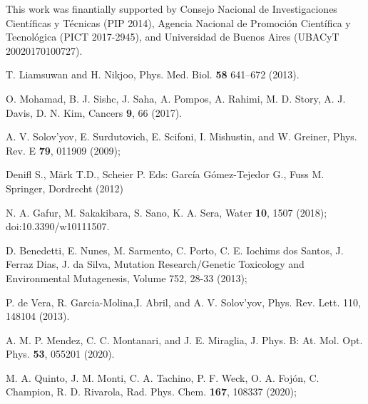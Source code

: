 \documentclass[10pt,showpacs,showkeys,twocolumn]{revtex4-1}
\begin{document}
This work was finantially supported by Consejo Nacional de
Investigaciones Cient\'ificas y T\'ecnicas (PIP 2014), Agencia 
Nacional de Promoci\'on Cient\'ifica y Tecnol\'ogica (PICT 2017-2945), 
and Universidad de Buenos Aires (UBACyT 20020170100727).

\begin{thebibliography}{}

T. Liamsuwan and H. Nikjoo, 
Phys. Med. Biol. \textbf{58}  641--672 (2013).

O. Mohamad, B. J. Sishc, J. Saha, A. Pompos, A. Rahimi, M. D. Story, 
A. J. Davis, D. N. Kim, 
Cancers \textbf{9}, 66 (2017).

A. V. Solov'yov, E. Surdutovich, E. Scifoni, I. Mishustin, and 
W. Greiner, 
Phys. Rev. E \textbf{79}, 011909 (2009);

Denifl S., Märk T.D., Scheier P. 
Eds: Garc\'ia G\'omez-Tejedor G., Fuss M. 
Springer, Dordrecht (2012) 

N. A. Gafur, M.  Sakakibara, S. Sano, K. A. Sera, 
Water \textbf{10}, 1507 (2018); doi:10.3390/w10111507.

D. Benedetti, E. Nunes, M. Sarmento, C. Porto, C. E. Iochims dos Santos, 
J. Ferraz Dias, J. da Silva,
Mutation Research/Genetic Toxicology and Environmental Mutagenesis,
Volume 752, 28-33 (2013);

P. de Vera, R. Garcia-Molina,I. Abril, and A. V. Solov’yov, 
Phys. Rev. Lett.  110, 148104 (2013).

A. M. P. Mendez, C. C. Montanari, and J. E. Miraglia, 
J. Phys. B: At. Mol. Opt. Phys.  \textbf{53}, 055201 (2020).

M. A. Quinto, J. M. Monti, C. A. Tachino, P. F. Weck, O. A. Foj\'on, 
C. Champion, R. D. Rivarola, 
Rad. Phys. Chem. \textbf{167}, 108337 (2020);


\end{thebibliography}
\end{document}
